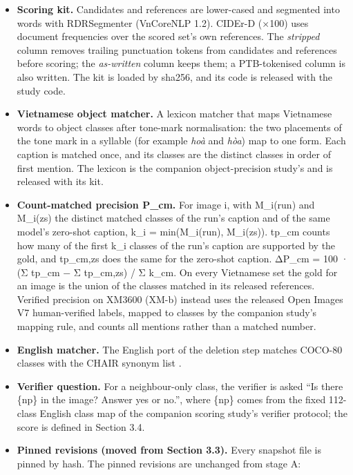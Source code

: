 \documentclass[manuscript,screen]{acmart}
\begin{document}
\begin{itemize}
\item
  \textbf{Scoring kit.} Candidates and references are lower-cased and segmented into words with
  RDRSegmenter (VnCoreNLP 1.2). CIDEr-D (×100) uses document frequencies over the scored set's own
  references. The \emph{stripped} column removes trailing punctuation tokens from candidates and
  references before scoring; the \emph{as-written} column keeps them; a PTB-tokenised column is also
  written. The kit is loaded by sha256, and its code is released with the study code.
\item
  \textbf{Vietnamese object matcher.} A lexicon matcher that maps Vietnamese words to object classes
  after tone-mark normalisation: the two placements of the tone mark in a syllable (for example
  \emph{hoà} and \emph{hòa}) map to one form. Each caption is matched once, and its classes are the
  distinct classes in order of first mention. The lexicon is the companion object-precision study's
  and is released with its kit.
\item
  \textbf{Count-matched precision P\_cm.} For image i, with M\_i(run) and M\_i(zs) the distinct
  matched classes of the run's caption and of the same model's zero-shot caption, k\_i =
  min(\textbar M\_i(run)\textbar, \textbar M\_i(zs)\textbar). tp\_cm counts how many of the first
  k\_i classes of the run's caption are supported by the gold, and tp\_cm,zs does the same for the
  zero-shot caption. ΔP\_cm = 100 · (Σ tp\_cm − Σ tp\_cm,zs) / Σ k\_cm. On every Vietnamese set the
  gold for an image is the union of the classes matched in its released references. Verified
  precision on XM3600 (XM-b) instead uses the released Open Images V7 human-verified labels, mapped
  to classes by the companion study's mapping rule, and counts all mentions rather than a matched
  number.
\item
  \textbf{English matcher.} The English port of the deletion step matches COCO-80 classes with the
  CHAIR synonym list \citep{Rohrbach2018CHAIR}.
\item
  \textbf{Verifier question.} For a neighbour-only class, the verifier is asked ``Is there \{np\} in
  the image? Answer yes or no.'', where \{np\} comes from the fixed 112-class English class map of
  the companion scoring study's verifier protocol; the score is defined in Section 3.4.
\item
  \textbf{Pinned revisions (moved from Section 3.3).} Every snapshot file is pinned by hash. The
  pinned revisions are unchanged from stage A:
\end{itemize}
\end{document}
